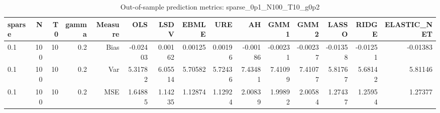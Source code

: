 \begin{table}[!htbp]\centering
\caption{Out-of-sample prediction metrics: sparse_0p1_N100_T10_g0p2}
\label{tab:table3_sparse_0p1_N100_T10_g0p2}
\begin{tabular}{lrrrrrrrrrrrrrr}
\hline
sparse & N & T0 & gamma & Measure & OLS & LSDV & EBMLE & URE & AH & GMM1 & GMM2 & LASSO & RIDGE & ELASTIC_NET \\
\hline
0.1 & 100 & 10 & 0.2 & Bias & -0.02403 & 0.00162 & 0.00125 & 0.00196 & -0.00186 & -0.00231 & -0.00237 & -0.01358 & -0.01251 & -0.01383 \\
0.1 & 100 & 10 & 0.2 & Var & 5.31782 & 6.05514 & 5.70582 & 5.72436 & 7.43481 & 7.41099 & 7.41077 & 5.81767 & 5.68142 & 5.81146 \\
0.1 & 100 & 10 & 0.2 & MSE & 1.64885 & 1.14235 & 1.12874 & 1.12924 & 2.00839 & 1.99892 & 2.00584 & 1.27437 & 1.25954 & 1.27377 \\
\hline
\end{tabular}
\end{table}

